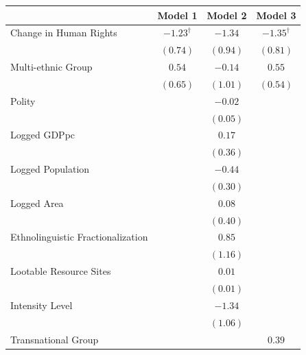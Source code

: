 \documentclass[12pt,]{book}
\let\origtable\table
\let\endorigtable\endtable
\renewenvironment{table}[1][2] {
    \singlespacing
    \expandafter\origtable\expandafter[H]
} {
    \endorigtable
}
\theoremstyle{definition}
\theoremstyle{definition}
\theoremstyle{definition}
\theoremstyle{remark}
\begin{document}
\begin{table}
\begin{center}
\begin{tabular}{l c c c }
\hline
 & Model 1 & Model 2 & Model 3 \\
\hline
Change in Human Rights            & $-1.23^{\dagger}$ & $-1.34$  & $-1.35^{\dagger}$ \\
                                  & $(0.74)$          & $(0.94)$ & $(0.81)$          \\
Multi-ethnic Group                & $0.54$            & $-0.14$  & $0.55$            \\
                                  & $(0.65)$          & $(1.01)$ & $(0.54)$          \\
Polity                            &                   & $-0.02$  &                   \\
                                  &                   & $(0.05)$ &                   \\
Logged GDPpc                      &                   & $0.17$   &                   \\
                                  &                   & $(0.36)$ &                   \\
Logged Population                 &                   & $-0.44$  &                   \\
                                  &                   & $(0.30)$ &                   \\
Logged Area                       &                   & $0.08$   &                   \\
                                  &                   & $(0.40)$ &                   \\
Ethnolinguistic Fractionalization &                   & $0.85$   &                   \\
                                  &                   & $(1.16)$ &                   \\
Lootable Resource Sites           &                   & $0.01$   &                   \\
                                  &                   & $(0.01)$ &                   \\
Intensity Level                   &                   & $-1.34$  &                   \\
                                  &                   & $(1.06)$ &                   \\
Transnational Group               &                   &          & $0.39$            \\

\end{tabular}
\end{center}
\end{table}
\end{document}
